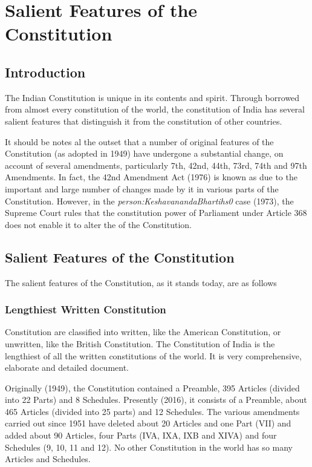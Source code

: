 \theendnotes
\cleardoublepage
\twocolumn

\chapter{Salient Features of the Constitution}

\section{Introduction}

The Indian Constitution is unique in its contents and spirit. Through borrowed from almost every constitution of the world, the constitution of India has several salient features that distinguish it from the constitution of other countries.

It should be notes al the outset that a number of original features of the Constitution (as adopted in 1949) have undergone a substantial change, on account of several amendments, particularly 7th, 42nd, 44th, 73rd, 74th and 97th Amendments. In fact, the 42nd Amendment Act (1976) is known as  due to the important and large number of changes made by it in various parts of the Constitution. However, in the { \textit{\gls{person:KeshavanandaBhartihs0}}} case (1973), the Supreme Court rules that the constitution power of Parliament under Article 368 does not enable it to alter the  of the Constitution.

\section{Salient Features of the Constitution}

The salient features of the Constitution, as it stands today, are as follows

\subsection{Lengthiest Written Constitution}

Constitution are classified into written, like the American Constitution, or unwritten, like the British Constitution. The Constitution of India is the lengthiest of all the written constitutions of the world. It is very comprehensive, elaborate and detailed document.

Originally (1949), the Constitution contained a Preamble, 395 Articles (divided into 22 Parts) and 8 Schedules. Presently (2016), it consists of a Preamble, about 465 Articles (divided into 25 parts) and 12 Schedules. The various amendments carried out since 1951 have deleted about 20 Articles and one Part (VII) and added about 90 Articles, four Parts (IVA, IXA, IXB and XIVA) and four Schedules (9, 10, 11 and 12). No other Constitution in the world has so many Articles and Schedules.

